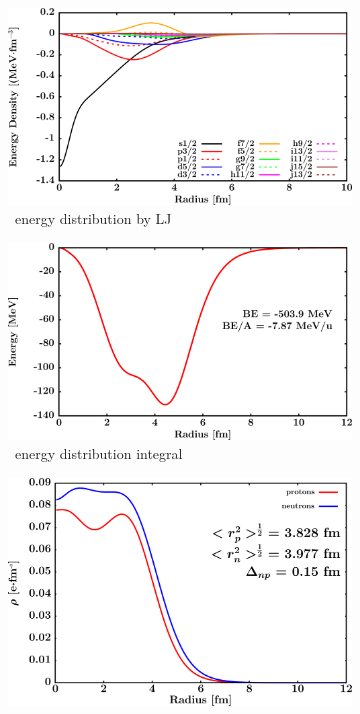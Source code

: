 \begin{figure}[hbtp]
    \begin{subfigure}{0.45\textwidth}
        \centering
        \includegraphics[width=\linewidth]{figures/ni64_EnergyDist.png}
        \caption{\niFour\ energy distribution by LJ}
        \label{DOMFitData_ni64_proton_energyDistInt}
    \end{subfigure}\hspace{6pt}
    \begin{subfigure}{0.45\textwidth}
        \centering
        \includegraphics[width=\linewidth]{figures/ni64_EnergyDistIntegral.png}
        \caption{\niFour\ energy distribution integral}
        \label{DOMFitData_ni64_neutron_energyDistInt}
    \end{subfigure}\vspace{0.4in}
    \begin{subfigure}{0.70\textwidth}
        \centering
        \includegraphics[width=\linewidth]{figures/ni64_matterDensity.png}

\end{subfigure}
\end{figure}
